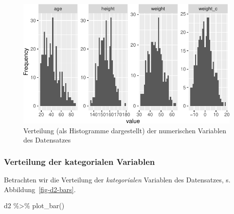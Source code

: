\documentclass[
  a4paper,
  DIV=11]{scrreprt}
\newenvironment{Shaded}{\begin{snugshade}}{\end{snugshade}}
\newcommand{\FunctionTok}[1]{\textcolor[rgb]{0.28,0.35,0.67}{#1}}
\newcommand{\NormalTok}[1]{\textcolor[rgb]{0.00,0.23,0.31}{#1}}
\newcommand{\SpecialCharTok}[1]{\textcolor[rgb]{0.37,0.37,0.37}{#1}}
\theoremstyle{definition}
\theoremstyle{remark}
\begin{document}
\begin{figure}[H]

{\centering \includegraphics{./lineare-modelle_files/figure-pdf/fig-d2-hists-1.pdf}

}

\caption{\label{fig-d2-hists}Verteilung (als Histogramme dargestellt)
der numerischen Variablen des Datensatzes}

\end{figure}

\hypertarget{verteilung-der-kategorialen-variablen}{%
\subsubsection{Verteilung der kategorialen
Variablen}\label{verteilung-der-kategorialen-variablen}}

Betrachten wir die Verteilung der \emph{kategorialen} Variablen des
Datensatzes, s. Abbildung~\ref{fig-d2-bars}.

\begin{Shaded}
\begin{Highlighting}[]
\NormalTok{d2 }\SpecialCharTok{\%\textgreater{}\%} \FunctionTok{plot\_bar}\NormalTok{()}
\end{Highlighting}
\end{Shaded}
\end{document}
